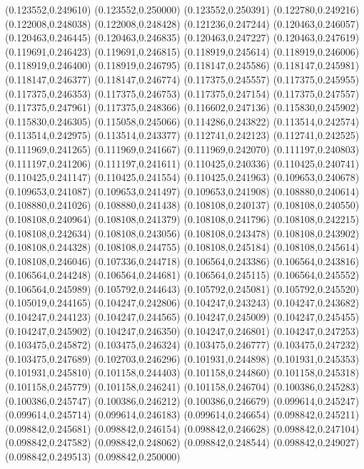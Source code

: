 (0.123552,0.249610)
(0.123552,0.250000)
(0.123552,0.250391)
(0.122780,0.249216)
(0.122008,0.248038)
(0.122008,0.248428)
(0.121236,0.247244)
(0.120463,0.246057)
(0.120463,0.246445)
(0.120463,0.246835)
(0.120463,0.247227)
(0.120463,0.247619)
(0.119691,0.246423)
(0.119691,0.246815)
(0.118919,0.245614)
(0.118919,0.246006)
(0.118919,0.246400)
(0.118919,0.246795)
(0.118147,0.245586)
(0.118147,0.245981)
(0.118147,0.246377)
(0.118147,0.246774)
(0.117375,0.245557)
(0.117375,0.245955)
(0.117375,0.246353)
(0.117375,0.246753)
(0.117375,0.247154)
(0.117375,0.247557)
(0.117375,0.247961)
(0.117375,0.248366)
(0.116602,0.247136)
(0.115830,0.245902)
(0.115830,0.246305)
(0.115058,0.245066)
(0.114286,0.243822)
(0.113514,0.242574)
(0.113514,0.242975)
(0.113514,0.243377)
(0.112741,0.242123)
(0.112741,0.242525)
(0.111969,0.241265)
(0.111969,0.241667)
(0.111969,0.242070)
(0.111197,0.240803)
(0.111197,0.241206)
(0.111197,0.241611)
(0.110425,0.240336)
(0.110425,0.240741)
(0.110425,0.241147)
(0.110425,0.241554)
(0.110425,0.241963)
(0.109653,0.240678)
(0.109653,0.241087)
(0.109653,0.241497)
(0.109653,0.241908)
(0.108880,0.240614)
(0.108880,0.241026)
(0.108880,0.241438)
(0.108108,0.240137)
(0.108108,0.240550)
(0.108108,0.240964)
(0.108108,0.241379)
(0.108108,0.241796)
(0.108108,0.242215)
(0.108108,0.242634)
(0.108108,0.243056)
(0.108108,0.243478)
(0.108108,0.243902)
(0.108108,0.244328)
(0.108108,0.244755)
(0.108108,0.245184)
(0.108108,0.245614)
(0.108108,0.246046)
(0.107336,0.244718)
(0.106564,0.243386)
(0.106564,0.243816)
(0.106564,0.244248)
(0.106564,0.244681)
(0.106564,0.245115)
(0.106564,0.245552)
(0.106564,0.245989)
(0.105792,0.244643)
(0.105792,0.245081)
(0.105792,0.245520)
(0.105019,0.244165)
(0.104247,0.242806)
(0.104247,0.243243)
(0.104247,0.243682)
(0.104247,0.244123)
(0.104247,0.244565)
(0.104247,0.245009)
(0.104247,0.245455)
(0.104247,0.245902)
(0.104247,0.246350)
(0.104247,0.246801)
(0.104247,0.247253)
(0.103475,0.245872)
(0.103475,0.246324)
(0.103475,0.246777)
(0.103475,0.247232)
(0.103475,0.247689)
(0.102703,0.246296)
(0.101931,0.244898)
(0.101931,0.245353)
(0.101931,0.245810)
(0.101158,0.244403)
(0.101158,0.244860)
(0.101158,0.245318)
(0.101158,0.245779)
(0.101158,0.246241)
(0.101158,0.246704)
(0.100386,0.245283)
(0.100386,0.245747)
(0.100386,0.246212)
(0.100386,0.246679)
(0.099614,0.245247)
(0.099614,0.245714)
(0.099614,0.246183)
(0.099614,0.246654)
(0.098842,0.245211)
(0.098842,0.245681)
(0.098842,0.246154)
(0.098842,0.246628)
(0.098842,0.247104)
(0.098842,0.247582)
(0.098842,0.248062)
(0.098842,0.248544)
(0.098842,0.249027)
(0.098842,0.249513)
(0.098842,0.250000)
